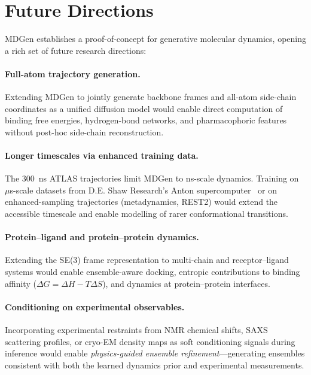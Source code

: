 \documentclass[11pt,a4paper]{article}
\begin{document}
\section{Future Directions}
\label{sec:future}

MDGen establishes a proof-of-concept for generative molecular dynamics, opening a rich set of
future research directions:

\paragraph{Full-atom trajectory generation.}
Extending MDGen to jointly generate backbone frames and all-atom side-chain coordinates as a
unified diffusion model would enable direct computation of binding free energies, hydrogen-bond
networks, and pharmacophoric features without post-hoc side-chain reconstruction.

\paragraph{Longer timescales via enhanced training data.}
The 300~ns ATLAS trajectories limit MDGen to ns-scale dynamics.  Training on $\mu$s-scale datasets
from D.E. Shaw Research's Anton supercomputer~\cite{shaw2010} or on enhanced-sampling
trajectories (metadynamics, REST2) would extend the accessible timescale and enable modelling of
rarer conformational transitions.

\paragraph{Protein--ligand and protein--protein dynamics.}
Extending the SE(3) frame representation to multi-chain and receptor--ligand systems would enable
ensemble-aware docking, entropic contributions to binding affinity ($\Delta G = \Delta H - T\Delta
S$), and dynamics at protein--protein interfaces.

\paragraph{Conditioning on experimental observables.}
Incorporating experimental restraints from NMR chemical shifts, SAXS scattering profiles, or
cryo-EM density maps as soft conditioning signals during inference would enable
\emph{physics-guided ensemble refinement}---generating ensembles consistent with both the learned
dynamics prior and experimental measurements.
\end{document}
